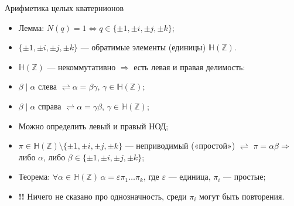 \documentclass[serif, aspectratio=169]{beamer}
\begin{document}
\begin{frame}{Арифметика целых кватернионов}
    \begin{itemize}
        \item Лемма: $N(q)=1 \Leftrightarrow q\in\{\pm1,\pm i,\pm j,\pm k\}$;
        \item $\{\pm1,\pm i,\pm j,\pm k\}$ --- обратимые элементы (единицы) $\mathbb{H}(\mathbb{Z})$.
        \item $\mathbb{H}(\mathbb{Z})$ --- некоммутативно $\Rightarrow$ есть левая и правая делимость:
        \item $\beta\mid \alpha$ слева $\rightleftharpoons \alpha=\beta\gamma$, $\gamma\in\mathbb{H}(\mathbb{Z})$;
        \item $\beta\mid \alpha$ справа $\rightleftharpoons \alpha=\gamma\beta$, $\gamma\in\mathbb{H}(\mathbb{Z})$;
        \item Можно определить левый и правый НОД;
        \item $\pi\in\mathbb{H}(\mathbb{Z})\setminus\{\pm1,\pm i,\pm j,\pm k\}$ --- неприводимый («простой») $\rightleftharpoons$ $\pi=\alpha\beta \Rightarrow$ либо $\alpha$, либо $\beta\in\{\pm1,\pm i,\pm j,\pm k\}$;
        \item Теорема: $\forall\alpha\in\mathbb{H}(\mathbb{Z})\,\alpha=\varepsilon \pi_1\dots\pi_k$, где $\varepsilon$ --- единица, $\pi_i$ --- простые;
        \item \textbf{!!} Ничего не сказано про однозначность, среди $\pi_i$ могут быть повторения.
    \end{itemize}
\end{frame}
\end{document}
